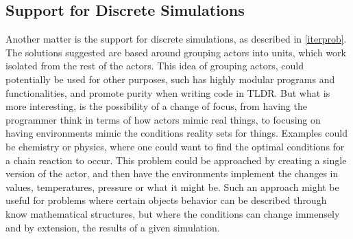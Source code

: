 \subsection{Support for Discrete Simulations}

Another matter is the support for discrete simulations, as described in \cref{iterprob}. The solutions suggested are based around grouping actors into units, which work isolated from the rest of the actors. This idea of grouping actors, could potentially be used for other purposes, such has highly modular programs and functionalities, and promote purity when writing code in TLDR. But what is more interesting, is the possibility of a change of focus, from having the programmer think in terms of how actors mimic real things, to focusing on having environments mimic the conditions reality sets for things. Examples could be chemistry or physics, where one could want to find the optimal conditions for a chain reaction to occur. This problem could be approached by creating a single version of the actor, and then have the environments implement the changes in values, temperatures, pressure or what it might be. Such an approach might be useful for problems where certain objects behavior can be described through know mathematical structures, but where the conditions can change immensely and by extension, the results of a given simulation.
